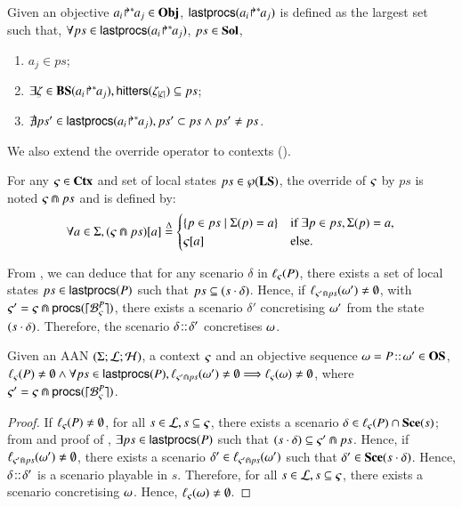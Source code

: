 \begin{definition}[$\lastprocs : \Obj\to\Sol$]
\label{def:lastprocs}
  Given an objective ${a_i\!\Rsh^*\!\!a_j} \in \mathbf{Obj}$, $\mathsf{lastprocs}({a_i\!\Rsh^*\!\!a_j})$ is
  defined as the largest set such that, $\forall ps\in\mathsf{lastprocs}({a_i\!\Rsh^*\!\!a_j})$, 
  $ps\in\mathbf{Sol}$,
  \begin{enumerate}
    \item $a_j \in ps$;
    \item $\exists \zeta \in \mathbf{BS}({a_i\!\Rsh^*\!\!a_j}),
      \mathsf{hitters}(\zeta_{|\zeta|}) \subseteq ps$;
    \item $\nexists ps' \in \mathsf{lastprocs}({a_i\!\Rsh^*\!\!a_j}),
      ps' \subset ps \wedge ps' \neq ps$.
  \end{enumerate}
\end{definition}

We also extend the override operator to contexts ().
\begin{definition}[$\Cap: \Ctx \times \powerset(\PHproc) \rightarrow \Ctx$]
\label{def:ctxcap}
  For any $\varsigma\in\mathbf{Ctx}$ and set of local states $ps \in \wp(\mathbf{LS})$,
  the override of $\varsigma$ by $ps$ is noted $\varsigma \Cap ps$ and is defined by:
  \[ \forall a \in \Sigma, {(\varsigma \Cap ps)[a]} \stackrel{\Delta}=
  \begin{cases}
    \{ p \in ps \mid \Sigma(p)=a \} & \text{if } \exists p \in ps, \Sigma(p)=a,\\
    {\varsigma[a]} & \text{else.}
  \end{cases}
  \]
\end{definition}

From , we can deduce that
for any scenario $\delta$ in $\ell_\varsigma(P)$,
there exists a set of local states $ps\in\mathsf{lastprocs}(P)$
such that $ps \subseteq (s\cdot\delta)$.
Hence, if $\ell_{\varsigma'\Cap ps}(\omega')\neq\emptyset$,
with $\varsigma'=\varsigma\Cap\mathsf{procs}(\lceil \mathcal{B}_{\varsigma}^{P}\rceil)$,
there exists a scenario $\delta'$ concretising $\omega'$ from the
state $(s\cdot\delta)$.
Therefore, the scenario $\delta\!::\!\delta'$ concretises
$\omega$.

\begin{theorem}
\label{thm:ordered-ua}
Given an AAN $(\Sigma; \mathcal{L}; \mathcal{H})$,
a context $\varsigma$ and an objective sequence $\omega =
P\!::\!\omega'\in\mathbf{OS}$,
$\ell_\varsigma(P)\neq\emptyset \wedge
	\forall ps \in\mathsf{lastprocs}(P),
	\ell_{\varsigma'\Cap ps}(\omega')\neq\emptyset
	\Longrightarrow \ell_\varsigma(\omega)\neq\emptyset$,
where $\varsigma' = \varsigma\Cap\mathsf{procs}(\lceil \mathcal{B}_{\varsigma}^{P}\rceil)$.
\end{theorem}
\begin{proof}
If $\ell_\varsigma(P)\neq\emptyset$,
for all $s\in \mathcal{L}, s\subseteq\varsigma$,
there exists a scenario $\delta\in\ell_\varsigma(P)\cap\mathbf{Sce}(s)$;
from  and proof of ,
$\exists ps\in\mathsf{lastprocs}(P)$ such that
$(s\cdot\delta)\subseteq\varsigma'\Cap ps$.
Hence, if $\ell_{\varsigma'\Cap ps}(\omega')\neq\emptyset$,
there exists a scenario $\delta'\in\ell_{\varsigma'\Cap ps}(\omega')$ such that
$\delta'\in\mathbf{Sce}(s\cdot\delta)$.
Hence, $\delta\!::\!\delta'$ is a scenario playable in $s$.
Therefore, for all $s\in \mathcal{L}, s\subseteq\varsigma$, there exists a scenario
concretising $\omega$.
Hence, $\ell_\varsigma(\omega)\neq\emptyset$.
\end{proof}



